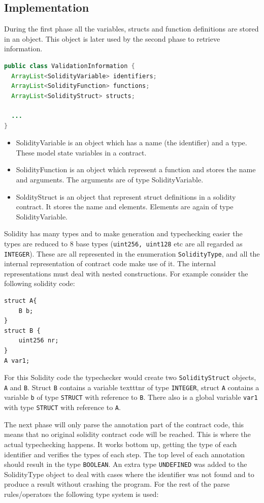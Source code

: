 \documentclass[a4paper]{article}
\begin{document}
\subsection{Implementation}
During the first phase all the variables, structs and function definitions are stored in an object. This object is later used by the second phase to retrieve information.
\begin{lstlisting}[breaklines=true, language=Java ]
public class ValidationInformation {
  ArrayList<SolidityVariable> identifiers;
  ArrayList<SolidityFunction> functions;
  ArrayList<SolidityStruct> structs;

  ...
}
\end{lstlisting}
\begin{itemize}
  \item SolidityVariable is an object which has a name (the identifier) and a type. These model state variables in a contract.
  \item SolidityFunction is an object which represent a function and stores the name and arguments. The arguments are of type SolidityVariable.
  \item SoldityStruct is an object that represent struct definitions in a solidity contract. It stores the name and elements. Elements are again of type SolidityVariable.
\end{itemize}
Solidity has many types and to make generation and typechecking easier the types are reduced to 8 base types (\texttt{uint256, uint128} etc are all regarded as \texttt{INTEGER}). These are all represented in the enumeration \texttt{SolidityType}, and all the internal representation of contract code make use of it. The internal representations must deal with nested constructions. For example consider the following solidity code:
\begin{lstlisting}[breaklines=true, language=Solidity ]
struct A{
    B b;
}
struct B {
    uint256 nr;
}
A var1;
\end{lstlisting}
For this Solidity code the typechecker would create two \texttt{SolidityStruct} objects, \texttt{A} and \texttt{B}. Struct \texttt{B} contains a variable texttt{nr} of type \texttt{INTEGER}, struct \texttt{A} contains a variable \texttt{b} of type \texttt{STRUCT} with reference to \texttt{B}. There also is a global variable \texttt{var1} with type \texttt{STRUCT} with reference to \texttt{A}. \par
The next phase will only parse the annotation part of the contract code, this means that no original solidity contract code will be reached. This is where the actual typechecking happens. It works bottom up, getting the type of each identifier and verifies the types of each step. The top level of each annotation should result in the type \texttt{BOOLEAN}. An extra type \texttt{UNDEFINED} was added to the SolidityType object to deal with cases where the identifier was not found and to produce a result without crashing the program. For the rest of the parse rules/operators the following type system is used:
\end{document}
